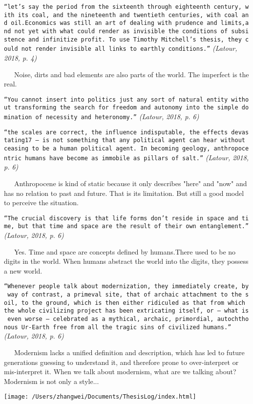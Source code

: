 \documentclass[
]{article}
\begin{document}
\texttt{“let’s\ say\ the\ period\ from\ the\ sixteenth\ through\ eighteenth\ century,\ with\ its\ coal,\ and\ the\ nineteenth\ and\ twentieth\ centuries,\ with\ coal\ and\ oil.Economics\ was\ still\ an\ art\ of\ dealing\ with\ prudence\ and\ limits,and\ not\ yet\ with\ what\ could\ render\ as\ invisible\ the\ conditions\ of\ subsistence\ and\ infinitize\ profit.\ To\ use\ Timothy\ Mitchell’s\ thesis,\ they\ could\ not\ render\ invisible\ all\ links\ to\ earthly\ conditions.”}
\emph{(Latour, 2018, p. 4)}

~~~Noise, dirts and bad elements are also parts of the world. The
imperfect is the real.

\texttt{“You\ cannot\ insert\ into\ politics\ just\ any\ sort\ of\ natural\ entity\ without\ transforming\ the\ search\ for\ freedom\ and\ autonomy\ into\ the\ simple\ domination\ of\ necessity\ and\ heteronomy.”}
\emph{(Latour, 2018, p. 6)}

\texttt{“the\ scales\ are\ correct,\ the\ influence\ indisputable,\ the\ effects\ devastating17\ —\ is\ not\ something\ that\ any\ political\ agent\ can\ hear\ without\ ceasing\ to\ be\ a\ human\ political\ agent.\ In\ becoming\ geology,\ anthropocentric\ humans\ have\ become\ as\ immobile\ as\ pillars\ of\ salt.”}
\emph{(Latour, 2018, p. 6)}

~~~Anthropocene is kind of static because it only describes "here" and
"now" and has no relation to past and future. That is its limitation.
But still a good model to perceive the situation.

\texttt{“The\ crucial\ discovery\ is\ that\ life\ forms\ don’t\ reside\ in\ space\ and\ time,\ but\ that\ time\ and\ space\ are\ the\ result\ of\ their\ own\ entanglement.”}
\emph{(Latour, 2018, p. 6)}

~~~Yes. Time and space are concepts defined by humans.There used to be
no digits in the world. When humans abstract the world into the digits,
they possess a new world.

\texttt{“Whenever\ people\ talk\ about\ modernization,\ they\ immediately\ create,\ by\ way\ of\ contrast,\ a\ primeval\ site,\ that\ of\ archaic\ attachment\ to\ the\ soil,\ to\ the\ ground,\ which\ is\ then\ either\ ridiculed\ as\ that\ from\ which\ the\ whole\ civilizing\ project\ has\ been\ extricating\ itself,\ or\ —\ what\ is\ even\ worse\ —\ celebrated\ as\ a\ mythical,\ archaic,\ primordial,\ autochthonous\ Ur-Earth\ free\ from\ all\ the\ tragic\ sins\ of\ civilized\ humans.”}
\emph{(Latour, 2018, p. 6)}

~~~Modernism lacks a unified definition and description, which has led
to future generations guessing to understand it, and therefore prone to
over-interpret or mis-interpret it. When we talk about modernism, what
are we talking about? Modernism is not only a style...

\texttt{[image: /Users/zhangwei/Documents/ThesisLog/index.html]}
\end{document}
